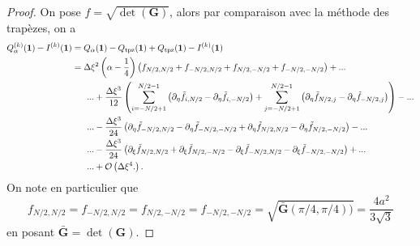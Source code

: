 \begin{proof}
On pose $f = \sqrt{\det(\mathbf{G})}$, alors par comparaison avec la méthode des trapèzes, on a 
\begin{align*}
Q_{\alpha}^{(k)}(\mathbf{1}) - I^{(k)}(\mathbf{1}) & = Q_{\alpha}(\mathbf{1}) - Q_{\text{tpz}}(\mathbf{1}) + Q_{\text{tpz}}(\mathbf{1}) - I^{(k)}(\mathbf{1})\\
	& = \Delta \xi^2 \left( \alpha - \dfrac{1}{4} \right) \left( f_{N/2,N/2} + f_{-N/2,N/2}+ f_{N/2,-N/2}+ f_{-N/2,-N/2} \right) + ...\\
	& \hspace{.6cm} ... + \dfrac{\Delta \xi^3}{12} \left( \displaystyle\sum\limits_{i=-N/2+1}^{N/2-1} \left( \partial_{\eta}\tilde{f}_{i, N/2} - \partial_{\eta}\tilde{f}_{i, -N/2} \right) + \displaystyle\sum\limits_{j=-N/2+1}^{N/2-1} \left( \partial_{\eta}\tilde{f}_{N/2,j} - \partial_{\eta}\tilde{f}_{-N/2,j} \right) \right) - ...  \\
	&  \hspace{.6cm}... - \dfrac{\Delta \xi^3}{24} \left( \partial_{\eta}\tilde{f}_{-N/2,N/2} - \partial_{\eta}\tilde{f}_{-N/2,-N/2} + \partial_{\eta}\tilde{f}_{N/2,N/2}  - \partial_{\eta}\tilde{f}_{N/2,-N/2} \right) - ...  \\
& \hspace{.6cm}... - \dfrac{\Delta \xi^3}{24} \left( \partial_{\xi}\tilde{f}_{N/2,N/2} + \partial_{\xi}\tilde{f}_{N/2,-N/2} - \partial_{\xi}\tilde{f}_{-N/2,N/2}  - \partial_{\xi}\tilde{f}_{-N/2,-N/2} \right)+...\\
& \hspace{.6cm}... + \mathcal{O} \left( \Delta \xi^4. \right).
\end{align*}
On note en particulier que 
\begin{equation}
f_{N/2,N/2} = f_{-N/2,N/2} = f_{N/2,-N/2} = f_{-N/2,-N/2} = \sqrt{\bar{\mathbf{G}}(\pi/4,\pi/4))} = \dfrac{4a^2}{3 \sqrt{3}} 
\end{equation}
en posant $\bar{\mathbf{G}} = \det (\mathbf{G})$.


\end{proof}

